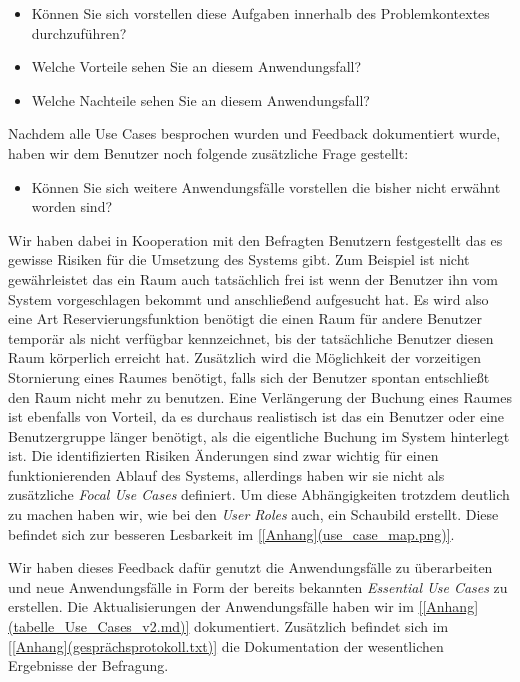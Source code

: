 \begin{itemize}
	\item Können Sie sich vorstellen diese Aufgaben innerhalb des Problemkontextes durchzuführen?
	\item Welche Vorteile sehen Sie an diesem Anwendungsfall?
	\item Welche Nachteile sehen Sie an diesem Anwendungsfall?
\end{itemize}

Nachdem alle Use Cases besprochen wurden und Feedback dokumentiert wurde, haben
wir dem Benutzer noch folgende zusätzliche Frage gestellt:

\begin{itemize}
	\item Können Sie sich weitere Anwendungsfälle vorstellen die bisher nicht erwähnt worden sind?
\end{itemize}

Wir haben dabei in Kooperation mit den Befragten Benutzern festgestellt das es
gewisse Risiken für die Umsetzung des Systems gibt. Zum Beispiel ist nicht
gewährleistet das ein Raum auch tatsächlich frei ist wenn der Benutzer ihn vom
System vorgeschlagen bekommt und anschließend aufgesucht hat. Es wird also eine
Art Reservierungsfunktion benötigt die einen Raum für andere Benutzer temporär
als nicht verfügbar kennzeichnet, bis der tatsächliche Benutzer diesen
Raum körperlich erreicht hat. Zusätzlich  wird die Möglichkeit der vorzeitigen
Stornierung eines Raumes benötigt, falls sich der Benutzer spontan entschließt
den Raum nicht mehr zu benutzen.
Eine Verlängerung der Buchung eines Raumes ist ebenfalls von Vorteil, da es
durchaus realistisch ist das ein Benutzer oder eine Benutzergruppe länger
benötigt, als die eigentliche Buchung im System hinterlegt ist.
Die identifizierten Risiken \bzw Änderungen sind zwar wichtig für einen
funktionierenden Ablauf des Systems, allerdings haben wir sie nicht als
zusätzliche \textit{Focal Use Cases} definiert. Um diese Abhängigkeiten
trotzdem  deutlich zu machen haben wir, wie bei den \textit{User Roles} auch, ein
Schaubild erstellt. Diese \textit{\citep[Kapitel~5]{softwareForUse}} befindet sich zur
besseren Lesbarkeit im \ref{[Anhang](use_case_map.png)}.

Wir haben dieses Feedback dafür genutzt die Anwendungsfälle zu überarbeiten
und neue Anwendungsfälle in Form der bereits bekannten \textit{Essential Use Cases}
zu erstellen. Die Aktualisierungen der Anwendungsfälle haben wir im
\ref{[Anhang](tabelle_Use_Cases_v2.md)} dokumentiert.
Zusätzlich befindet sich im \ref{[Anhang](gesprächsprotokoll.txt)} die Dokumentation
der wesentlichen Ergebnisse der Befragung.


